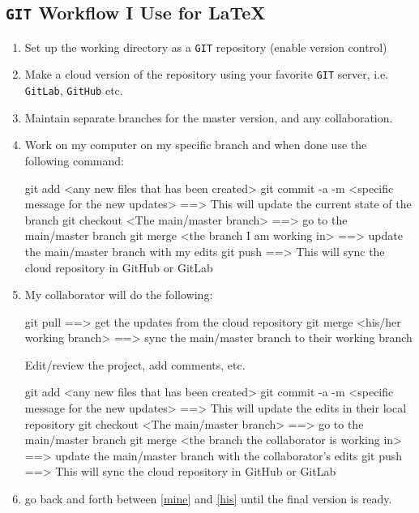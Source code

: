 \documentclass[a4paper, 12pt, one column]{article}
\begin{document}
\subsection{\texttt{GIT} Workflow I Use for \LaTeX}
\begin{enumerate}
    \item Set up the working directory as a \texttt{GIT} repository (enable version control)
    \item Make a cloud version of the repository using your favorite \texttt{GIT} server, i.e. \texttt{GitLab}, \texttt{GitHub} etc. 
    \item Maintain separate branches for the master version, and any collaboration. 
    \item Work on my computer on my specific branch and when done use the following command: \label{mine}
    \begin{spverbatim}
        git add <any new files that has been created>
        git commit -a -m <specific message for the new updates> 
            ==> This will update the current state of the branch
        git checkout <The main/master branch> 
            ==> go to the main/master branch
        git merge <the branch I am working in> 
            ==> update the main/master branch with my edits
        git push  
            ==> This will sync the cloud repository in GitHub or GitLab

    \end{spverbatim}

    \item My collaborator will do the following: \label{his}
    \begin{spverbatim}
        git pull 
            ==> get the updates from the cloud repository
        git merge <his/her working branch>
            ==> sync the main/master branch to their working branch

        Edit/review the project, add comments, etc.     

        git add <any new files that has been created>
        git commit -a -m <specific message for the new updates> 
            ==> This will update the edits in their local repository
        git checkout <The main/master branch> 
            ==> go to the main/master branch
        git merge <the branch the collaborator is working in> 
            ==> update the main/master branch with the collaborator's edits
        git push  
            ==> This will sync the cloud repository in GitHub or GitLab
    \end{spverbatim}
    \item go back and forth between \ref{mine} and \ref{his} until the final version is ready. 
\end{enumerate}




\end{document}
